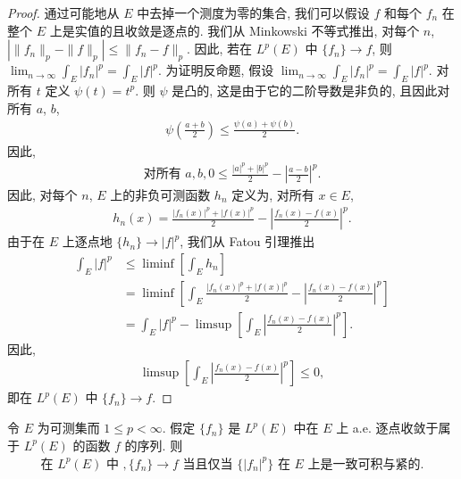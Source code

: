 \documentclass[../../main.tex]{subfiles}
\begin{document}
\begin{proof}
通过可能地从 $E$ 中去掉一个测度为零的集合, 我们可以假设 $f$ 和每个 $f_{n}$ 在整个 $E$ 上是实值的且收敛是逐点的. 我们从 Minkowski 不等式推出, 对每个 $n$, $|\|f_{n}\|_{p}-\|f\|_{p}|\leqslant\|f_{n}-f\|_{p}$. 因此, 若在 $L^{p}(E)$ 中 $\{f_{n}\}\to f$, 则 $\lim_{n\to\infty}\int_{E}|f_{n}|^{p}=\int_{E}|f|^{p}$. 为证明反命题, 假设 $\lim_{n\to\infty}\int_{E}|f_{n}|^{p}=\int_{E}|f|^{p}$. 对所有 $t$ 定义 $\psi(t)=t^{p}$. 则 $\psi$ 是凸的, 这是由于它的二阶导数是非负的, 且因此对所有 $a$, $b$,
\begin{align*}
\psi\left(\frac{a+b}{2}\right)\leqslant\frac{\psi(a)+\psi(b)}{2}.
\end{align*}
因此,
\begin{align*}
\text{对所有 }a,b,0\leqslant\frac{|a|^{p}+|b|^{p}}{2}-\left|\frac{a-b}{2}\right|^{p}.
\end{align*}
因此, 对每个 $n$, $E$ 上的非负可测函数 $h_{n}$ 定义为, 对所有 $x\in E$,
\begin{align*}
h_{n}(x)=\frac{|f_{n}(x)|^{p}+|f(x)|^{p}}{2}-\left|\frac{f_{n}(x)-f(x)}{2}\right|^{p}.
\end{align*}
由于在 $E$ 上逐点地 $\{h_{n}\}\to|f|^{p}$, 我们从 Fatou 引理推出
\begin{align*}
\int_{E}|f|^{p}&\leqslant\liminf\left[\int_{E}h_{n}\right]\\
&=\liminf\left[\int_{E}\frac{|f_{n}(x)|^{p}+|f(x)|^{p}}{2}-\left|\frac{f_{n}(x)-f(x)}{2}\right|^{p}\right]\\
&=\int_{E}|f|^{p}-\limsup\left[\int_{E}\left|\frac{f_{n}(x)-f(x)}{2}\right|^{p}\right].
\end{align*}
因此,
\begin{align*}
\limsup\left[\int_{E}\left|\frac{f_{n}(x)-f(x)}{2}\right|^{p}\right]\leqslant 0,
\end{align*}
即在 $L^{p}(E)$ 中 $\{f_{n}\}\to f$.
\end{proof}

\begin{theorem}\label{theorem:ch07-Vitali判别}
令 $E$ 为可测集而 $1\leqslant p<\infty$. 假定 $\{f_{n}\}$ 是 $L^{p}(E)$ 中在 $E$ 上 a.e. 逐点收敛于属于 $L^{p}(E)$ 的函数 $f$ 的序列. 则
\begin{align*}
\text{在 }L^{p}(E)\text{ 中 },\{f_{n}\}\to f\text{ 当且仅当 }\{|f_{n}|^{p}\}\text{ 在 }E\text{ 上是一致可积与紧的}.
\end{align*}
\end{theorem}
\end{document}
